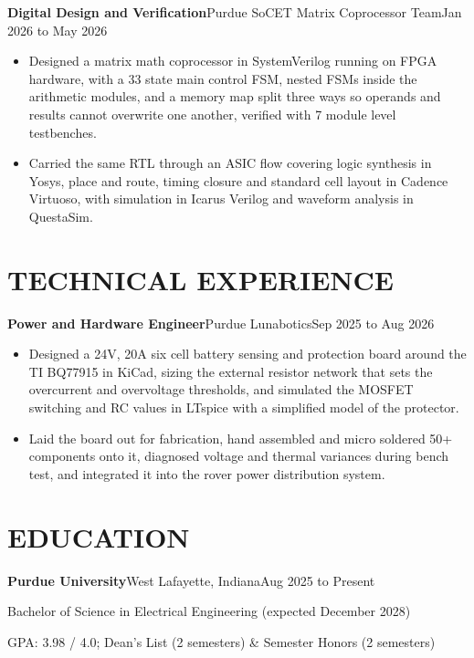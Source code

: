 \documentclass[11pt]{article}
\newcommand{\entry}[3]{\noindent\textbf{#1}\hspace{0.45em}\textbar\hspace{0.45em}#2\hspace{0.45em}\textbar\hspace{0.45em}#3\par}
\begin{document}
\entry{Digital Design and Verification}{Purdue SoCET Matrix Coprocessor Team}{Jan 2026 to May 2026}
\begin{itemize}
    \item Designed a matrix math coprocessor in SystemVerilog running on FPGA hardware, with a 33 state main control FSM, nested FSMs inside the arithmetic modules, and a memory map split three ways so operands and results cannot overwrite one another, verified with 7 module level testbenches. %
    \item Carried the same RTL through an ASIC flow covering logic synthesis in Yosys, place and route, timing closure and standard cell layout in Cadence Virtuoso, with simulation in Icarus Verilog and waveform analysis in QuestaSim. %
\end{itemize}


\section{TECHNICAL EXPERIENCE}

\entry{Power and Hardware Engineer}{Purdue Lunabotics}{Sep 2025 to Aug 2026}
\begin{itemize}
    \item Designed a 24V, 20A six cell battery sensing and protection board around the TI BQ77915 in KiCad, sizing the external resistor network that sets the overcurrent and overvoltage thresholds, and simulated the MOSFET switching and RC values in LTspice with a simplified model of the protector. %
    \item Laid the board out for fabrication, hand assembled and micro soldered 50+ components onto it, diagnosed voltage and thermal variances during bench test, and integrated it into the rover power distribution system. %
\end{itemize}


\section{EDUCATION}

\entry{Purdue University}{West Lafayette, Indiana}{Aug 2025 to Present}
Bachelor of Science in Electrical Engineering (expected December 2028)\par
GPA: 3.98 / 4.0; Dean's List (2 semesters) \& Semester Honors (2 semesters)\par
\end{document}
